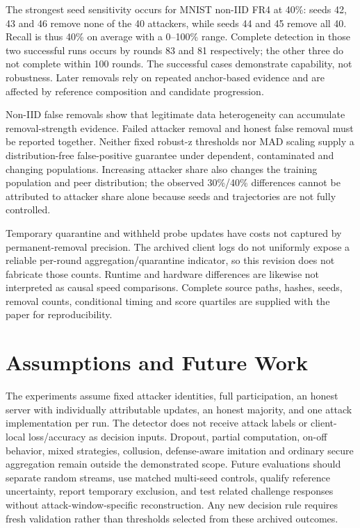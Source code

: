 \documentclass[conference]{IEEEtran}
\begin{document}
The strongest seed sensitivity occurs for MNIST non-IID FR4 at 40\%: seeds 42, 43 and 46 remove none of the 40 attackers, while seeds 44 and 45 remove all 40. Recall is thus 40\% on average with a 0--100\% range. Complete detection in those two successful runs occurs by rounds 83 and 81 respectively; the other three do not complete within 100 rounds. The successful cases demonstrate capability, not robustness. Later removals rely on repeated anchor-based evidence and are affected by reference composition and candidate progression.

Non-IID false removals show that legitimate data heterogeneity can accumulate removal-strength evidence. Failed attacker removal and honest false removal must be reported together. Neither fixed robust-z thresholds nor MAD scaling supply a distribution-free false-positive guarantee under dependent, contaminated and changing populations. Increasing attacker share also changes the training population and peer distribution; the observed 30\%/40\% differences cannot be attributed to attacker share alone because seeds and trajectories are not fully controlled.

Temporary quarantine and withheld probe updates have costs not captured by permanent-removal precision. The archived client logs do not uniformly expose a reliable per-round aggregation/quarantine indicator, so this revision does not fabricate those counts. Runtime and hardware differences are likewise not interpreted as causal speed comparisons. Complete source paths, hashes, seeds, removal counts, conditional timing and score quartiles are supplied with the paper for reproducibility.

\section{Assumptions and Future Work}
The experiments assume fixed attacker identities, full participation, an honest server with individually attributable updates, an honest majority, and one attack implementation per run. The detector does not receive attack labels or client-local loss/accuracy as decision inputs. Dropout, partial computation, on-off behavior, mixed strategies, collusion, defense-aware imitation and ordinary secure aggregation remain outside the demonstrated scope. Future evaluations should separate random streams, use matched multi-seed controls, qualify reference uncertainty, report temporary exclusion, and test related challenge responses without attack-window-specific reconstruction. Any new decision rule requires fresh validation rather than thresholds selected from these archived outcomes.
\end{document}
